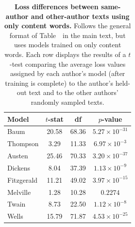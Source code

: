 \documentclass[10pt]{article}
\begin{document}
\begin{table}[h]
\centering
\small
\begin{tabular}{lccc}
\hline
\textbf{Model} & \textbf{$t$-stat} & \textbf{df} & \textbf{$p$-value}\\
\hline
Baum         & 20.58 & 68.36 & $5.27 \times 10^{-31}$  \\
Thompson     & 3.29 & 11.33 & $6.97 \times 10^{-3}$  \\
Austen       & 25.46 & 70.33 & $3.20 \times 10^{-37}$  \\
Dickens      & 8.04 & 37.39 & $1.13 \times 10^{-9}$  \\
Fitzgerald   & 11.21 & 49.02 & $3.97 \times 10^{-15}$  \\
Melville     & 1.28 & 10.28 & $0.2274$  \\
Twain        & 8.73 & 22.50 & $1.12 \times 10^{-8}$  \\
Wells        & 15.79 & 71.87 & $4.53 \times 10^{-25}$  \\
\hline
\end{tabular}

\caption{\textbf{Loss differences between same-author and other-author texts
using only content words.} Follows the general format of Table~\authortable~in
the main text, but uses models trained on only content words. Each row displays
the results of a $t$-test comparing the average loss values assigned by each
author's model (after training is complete) to the author's held-out text and
to the other authors' randomly sampled texts.}

\label{tab:t-tests-content}
\end{table}
\end{document}
